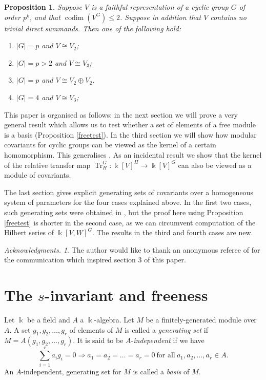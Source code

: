 \documentclass[a4paper]{amsart}
\newcommand{\kk}{\Bbbk}
\def\codim{\operatorname{codim}}
\def\Tr{\operatorname{Tr}}
\newtheorem{prop}[Lemma]{Proposition}
\newtheorem*{Corollary of Conjecture}{Corollary of Conjecture}
\theoremstyle{definition}
\theoremstyle{remark}
\theoremstyle{Acknowledgments}
\newtheorem{ack}{Acknowledgments.}
\begin{document}
\begin{prop}\label{listmodules} Suppose $V$ is a faithful representation of a cyclic group $G$ of order $p^k$, and that $\codim(V^G) \leq 2$. Suppose in addition that $V$ contains no trivial direct summands. Then one of the following hold:

\begin{enumerate}
\item $|G| = p$ and $V \cong V_2$;

\item $|G| = p>2$ and $V \cong V_3$;

\item $|G| = p$ and $V \cong V_2 \oplus V_2$.

\item $|G| = 4$ and $V \cong V_3$;


\end{enumerate}
\end{prop}
 
This paper is organised as follows: in the next section we will prove a very general result which allows us to test whether a set of elements of a free module is a basis (Proposition \ref{freetest}). In the third section we will show how modular covariants for cyclic groups can be viewed as the kernel of a certain homomorphism. This generalises \cite[Proposition~4]{ElmerCov}. As an incidental result we show that the kernel of the relative transfer map $\Tr^G_H: \kk[V]^H \rightarrow \kk[V]^G$ can also be viewed as a module of covariants. 

The last section gives explicit generating sets of covariants over a homogeneous system of parameters for the four cases explained above. In the first two cases, such generating sets were obtained in \cite{ElmerCov}, but the proof here using Proposition \ref{freetest} is shorter in the second case, as we can circumvent computation of the Hilbert series of $\kk[V,W]^G$. The results in the third and fourth cases are new.

\begin{ack}
The author would like to thank an anonymous referee of \cite{ElmerCov} for the communication which inspired section 3 of this paper.
\end{ack}


\section{The $s$-invariant and freeness}

Let $\kk$ be a field and $A$ a $\kk$-algebra. Let $M$ be a finitely-generated module over $A$. A set $g_1,g_2, \ldots, g_r$ of elements of $M$ is called a {\it generating set} if $M = A(g_1,g_2,\ldots, g_r)$. It is said to be $A$-\emph{independent} if we have
\[\sum_{i=1}^r a_ig_i  = 0 \Rightarrow a_1=a_2= \ldots = a_r=0 \ \text{for all} \ a_1,a_2, \ldots, a_r \in A.\] An $A$-independent, generating set for $M $ is called a \emph{basis} of $M$. 
\end{document}
